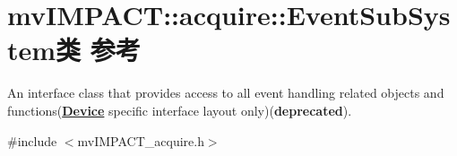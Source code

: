\hypertarget{classmv_i_m_p_a_c_t_1_1acquire_1_1_event_sub_system}{\section{mv\+I\+M\+P\+A\+C\+T\+:\+:acquire\+:\+:Event\+Sub\+System类 参考}
\label{classmv_i_m_p_a_c_t_1_1acquire_1_1_event_sub_system}
}


An interface class that provides access to all event handling related objects and functions({\bfseries \hyperlink{classmv_i_m_p_a_c_t_1_1acquire_1_1_device}{Device}} specific interface layout only)({\bfseries deprecated}).  




{\ttfamily \#include $<$mv\+I\+M\+P\+A\+C\+T\+\_\+acquire.\+h$>$}

